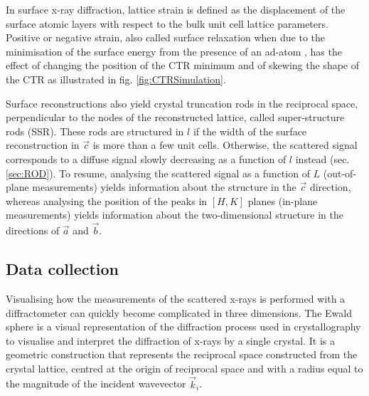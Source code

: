 In surface x-ray diffraction, lattice strain is defined as the displacement of the surface atomic layers with respect to the bulk unit cell lattice parameters.
Positive or negative strain, also called surface relaxation when due to the minimisation of the surface energy from the presence of an ad-atom \parencite{Gupta1981}, has the effect of changing the position of the CTR minimum and of skewing the shape of the CTR as illustrated in fig. \ref{fig:CTRSimulation}.

Surface reconstructions also yield crystal truncation rods in the reciprocal space, perpendicular to the nodes of the reconstructed lattice, called super-structure rods (SSR).
These rods are structured in $l$ if the width of the surface reconstruction in $\vec{c}$ is more than a few unit cells.
Otherwise, the scattered signal corresponds to a diffuse signal slowly decreasing as a function of $l$ instead (sec. \ref{sec:ROD}).
To resume, analysing the scattered signal as a function of $L$ (out-of-plane measurements) yields information about the structure in the $\vec{c}$ direction, whereas analysing the position of the peaks in $[H, K]$ planes (in-plane measurements) yields information about the two-dimensional structure in the directions of $\vec{a}$ and $\vec{b}$.

\subsection{Data collection} \label{sec:DataCollectionSXRD}

Visualising how the measurements of the scattered x-rays is performed with a diffractometer can quickly become complicated in three dimensions.
The Ewald sphere is a visual representation of the diffraction process used in crystallography to visualise and interpret the diffraction of x-rays by a single crystal.
It is a geometric construction that represents the reciprocal space constructed from  the crystal lattice, centred at the origin of reciprocal space and with a radius equal to the magnitude of the incident wavevector $\vec{k}_i$.

